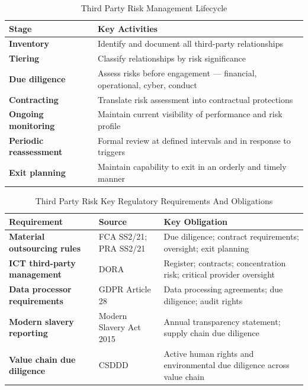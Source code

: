 \begin{table}[H]
  \centering
  \renewcommand{\arraystretch}{1.5}
  \begin{tabularx}{\textwidth}{ | >{\raggedright\arraybackslash}p{} 
                                | >{\raggedright\arraybackslash}X | }
    \hline
    \textbf{Stage} & \textbf{Key Activities}\\
    \hline
    \textbf{Inventory} & Identify and document all third-party relationships\\
    \hline
    \textbf{Tiering} & Classify relationships by risk significance\\
    \hline
    \textbf{Due diligence} & Assess risks before engagement — financial, operational, cyber, conduct\\
    \hline
    \textbf{Contracting} & Translate risk assessment into contractual protections\\
    \hline
    \textbf{Ongoing monitoring} & Maintain current visibility of performance and risk profile\\
    \hline
    \textbf{Periodic reassessment} & Formal review at defined intervals and in response to triggers\\
    \hline
    \textbf{Exit planning} & Maintain capability to exit in an orderly and timely manner\\
    \hline
  \end{tabularx}
  \caption{Third Party Risk Management Lifecycle}
\end{table}


\begin{table}[H]
  \centering
  \renewcommand{\arraystretch}{1.5}
  \begin{tabularx}{\textwidth}{ | >{\raggedright\arraybackslash}p{} 
								| >{\raggedright\arraybackslash}p{} 
                                | >{\raggedright\arraybackslash}X | }
    \hline
    \textbf{Requirement} & \textbf{Source} & \textbf{Key Obligation} \\
    \hline
    \textbf{Material outsourcing rules} & FCA SS2/21; PRA SS2/21 & Due diligence; contract requirements; oversight; exit planning\\
    \hline
    \textbf{ICT third-party management} & DORA & Register; contracts; concentration risk; critical provider oversight\\
    \hline
    \textbf{Data processor requirements} & GDPR Article 28 & Data processing agreements; due diligence; audit rights\\
    \hline
    \textbf{Modern slavery reporting} & Modern Slavery Act 2015 & Annual transparency statement; supply chain due diligence\\
    \hline
    \textbf{Value chain due diligence} & CSDDD & Active human rights and environmental due diligence across value chain\\
    \hline
  \end{tabularx}
  \caption{Third Party Risk Key Regulatory Requirements And Obligations}
\end{table}

